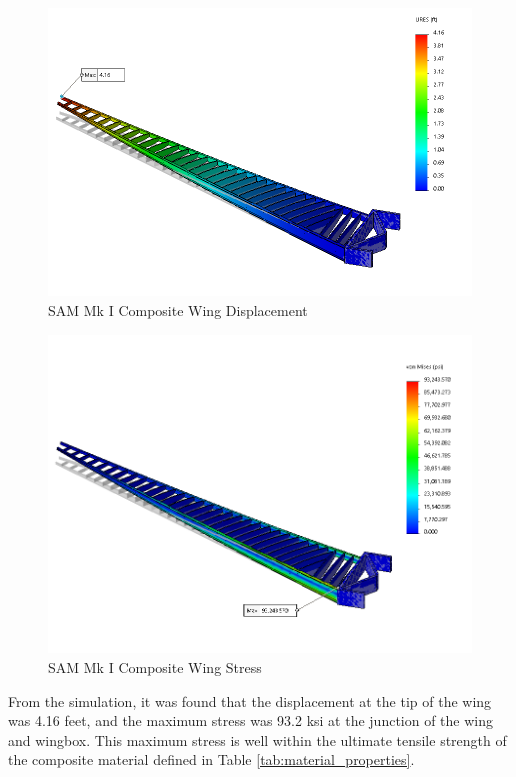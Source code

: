 \begin{figure}[!h]
    \centering
    \includegraphics[width=\linewidth]{Photos/structuresandloads/Wing Displacement Composite.PNG}
    \caption{SAM Mk I Composite Wing Displacement}
    \label{fig:wing_displacement}
\end{figure}
\begin{figure}[!h]
    \centering
    \includegraphics[width=\linewidth]{Photos/structuresandloads/Wing Stress Composite.PNG}
    \caption{SAM Mk I Composite Wing Stress}
    \label{fig:wing_stress}
\end{figure}
\FloatBarrier

From the simulation, it was found that the displacement at the tip of the wing was 4.16 feet, and the maximum stress was 93.2 ksi at the junction of the wing and wingbox. This maximum stress is well within the ultimate tensile strength of the composite material defined in Table \ref{tab:material_properties}. 


